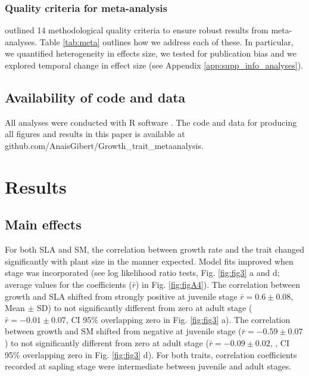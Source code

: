 \documentclass[a4paper]{article}\usepackage[]{graphicx}\usepackage[]{color}
\begin{document}
\subsubsection*{Quality criteria for meta-analysis}

\cite{Koricheva:2014ku} outlined 14 methodological quality criteria to ensure robust results from meta-analyses. Table \ref{tab:meta} outlines how we address each of these.  In particular, we quantified heterogeneity in effects size, we tested for publication bias and we explored temporal change in effect size (see Appendix \ref{app:supp_info_analyses}).

\subsection*{Availability of code and data}\label{code}

All analyses were conducted with R software \citep{Ralanguageanden:2014wf}. The code and data for producing all figures and results in this paper is available at github.com/AnaisGibert/Growth\_trait\_metaanalysis.

\section*{Results}\label{results}

\subsection*{Main effects}

For both SLA and SM, the correlation between growth rate and the trait changed significantly with plant size in the manner expected. Model fits improved when stage was incorporated (see log likelihood ratio tests, Fig. \ref{fig:fig3} a and d; average values for the coefficients ($\bar{r}$) in Fig. \ref{fig:figA4}). The correlation between growth and SLA shifted from strongly positive at juvenile stage $\bar{r}=0.6 \pm 0.08$, Mean $\pm$ SD) to not significantly different from zero at adult stage ($\bar{r}= -0.01 \pm 0.07$, CI 95\% overlapping zero in Fig. \ref{fig:fig3} a). The correlation between growth and SM shifted from negative at juvenile stage ($\bar{r}= -0.59 \pm 0.07$) to not significantly different from zero at adult stage ($\bar{r}= -0.09 \pm 0.02$, , CI 95\% overlapping zero in Fig. \ref{fig:fig3} d). For both traits, correlation coefficients recorded at sapling stage were intermediate between juvenile and adult stages.
\end{document}
